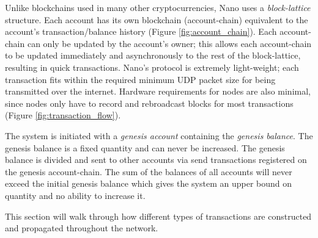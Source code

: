Unlike blockchains used in many other cryptocurrencies, Nano uses a \textit{block-lattice} structure. Each account has its own blockchain (account-chain) equivalent to the account's transaction/balance history (Figure \ref{fig:account_chain}). Each account-chain can only be updated by the account's owner; this allows each account-chain to be updated immediately and asynchronously to the rest of the block-lattice, resulting in quick transactions. Nano's protocol is extremely light-weight; each transaction fits within the required minimum UDP packet size for being transmitted over the internet. Hardware requirements for nodes are also minimal, since nodes only have to record and rebroadcast blocks for most transactions (Figure \ref{fig:transaction_flow}).

The system is initiated with a \textit{genesis account} containing the \textit{genesis balance}. The genesis balance is a fixed quantity and can never be increased. The genesis balance is divided and sent to other accounts via send transactions registered on the genesis account-chain. The sum of the balances of all accounts will never exceed the initial genesis balance which gives the system an upper bound on quantity and no ability to increase it.

This section will walk through how different types of transactions are constructed and propagated throughout the network.

